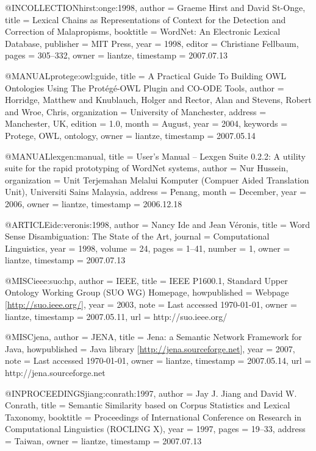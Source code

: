 @INCOLLECTION{hirst:onge:1998,
  author = {Graeme Hirst and David St-Onge},
  title = {Lexical Chains as Representations of Context for the Detection and
	Correction of Malapropisms},
  booktitle = {WordNet: An Electronic Lexical Database},
  publisher = {MIT Press},
  year = {1998},
  editor = {Christiane Fellbaum},
  pages = {305--332},
  owner = {liantze},
  timestamp = {2007.07.13}
}

@MANUAL{protege:owl:guide,
  title = {A Practical Guide To Building {OWL} Ontologies Using The {Prot\'{e}g\'{e}-OWL}
	Plugin and {CO-ODE} Tools},
  author = {Horridge, Matthew and Knublauch, Holger and Rector, Alan and Stevens,
	Robert and Wroe, Chris},
  organization = {University of Manchester},
  address = {Manchester, UK},
  edition = {1.0},
  month = {August},
  year = {2004},
  keywords = {Protege, OWL, ontology},
  owner = {liantze},
  timestamp = {2007.05.14}
}

@MANUAL{lexgen:manual,
  title = {User's Manual -- {Lexgen Suite} 0.2.2: A utility suite for the rapid
	prototyping of {WordNet} systems},
  author = {Nur Hussein},
  organization = {Unit Terjemahan Melalui Komputer (Compuer Aided Translation Unit),
	Universiti Sains Malaysia},
  address = {Penang},
  month = {December},
  year = {2006},
  owner = {liantze},
  timestamp = {2006.12.18}
}

@ARTICLE{ide:veronis:1998,
  author = {Nancy Ide and Jean V\'eronis},
  title = {{Word Sense Disambiguation: The State of the Art}},
  journal = {Computational Linguistics},
  year = {1998},
  volume = {24},
  pages = {1--41},
  number = {1},
  owner = {liantze},
  timestamp = {2007.07.13}
}

@MISC{ieee:suo:hp,
  author = {IEEE},
  title = {{IEEE P1600.1, Standard Upper Ontology Working Group (SUO WG) Homepage}},
  howpublished = {Webpage [\url{http://suo.ieee.org/}]},
  year = {2003},
  note = {Last accessed \today},
  owner = {liantze},
  timestamp = {2007.05.11},
  url = {http://suo.ieee.org/}
}

@MISC{jena,
  author = {JENA},
  title = {Jena: a Semantic Network Framework for Java},
  howpublished = {Java library [\url{http://jena.sourceforge.net}]},
  year = {2007},
  note = {Last accessed \today},
  owner = {liantze},
  timestamp = {2007.05.14},
  url = {http://jena.sourceforge.net}
}

@INPROCEEDINGS{jiang:conrath:1997,
  author = {Jay J. Jiang and David W. Conrath},
  title = {Semantic Similarity based on Corpus Statistics and Lexical Taxonomy},
  booktitle = {Proceedings of International Conference on Research in Computational
	Linguistics (ROCLING X)},
  year = {1997},
  pages = {19--33},
  address = {Taiwan},
  owner = {liantze},
  timestamp = {2007.07.13}
}

